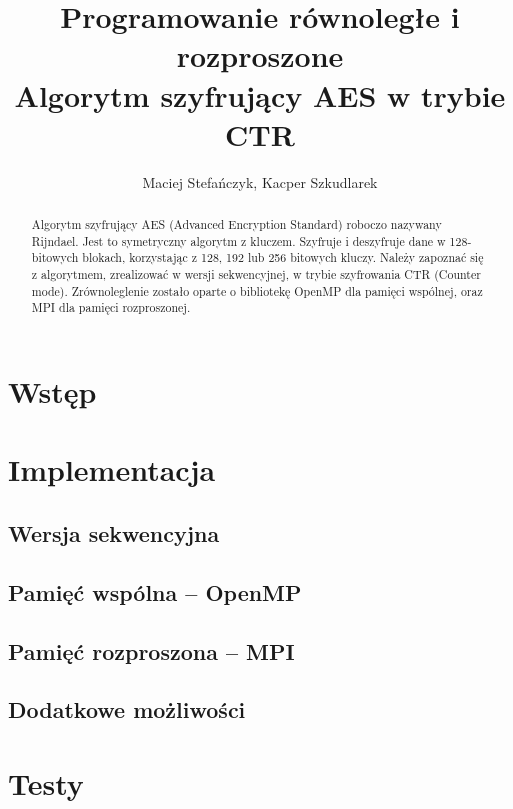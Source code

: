 \documentclass[a4paper,12pt]{article}
\begin{document}
\title{{\small Programowanie równoległe i rozproszone}\\Algorytm szyfrujący AES w trybie CTR}
\author{Maciej Stefańczyk, Kacper Szkudlarek}

\maketitle

\begin{abstract}
Algorytm szyfrujący AES (Advanced Encryption Standard) roboczo nazywany
Rijndael. Jest to symetryczny algorytm z kluczem. Szyfruje i deszyfruje dane w 128-
bitowych blokach, korzystając z 128, 192 lub 256 bitowych kluczy. Należy zapoznać się
z algorytmem, zrealizować w wersji sekwencyjnej, w trybie szyfrowania CTR (Counter
mode). Zrównoleglenie zostało oparte o bibliotekę OpenMP dla pamięci wspólnej, oraz
MPI dla pamięci rozproszonej.
\end{abstract}


\section{Wstęp}

\section{Implementacja}

\subsection{Wersja sekwencyjna}

\subsection{Pamięć wspólna -- OpenMP}

\subsection{Pamięć rozproszona -- MPI}

\subsection{Dodatkowe możliwości}

\section{Testy}
\end{document}
